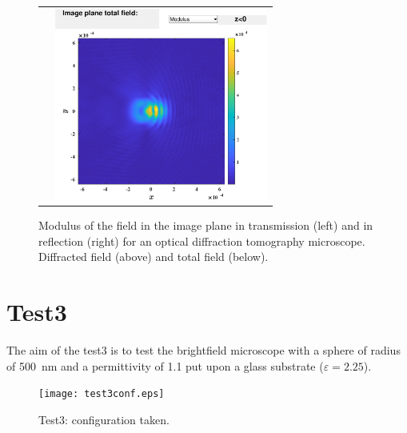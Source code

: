 \begin{figure}[H]
\begin{center}
\begin{tabular}{cc}
&  \includegraphics*[width=7.0cm,draft=false]{test2imageincneg.eps}

\end{tabular}

\end{center}
\caption{Modulus of the field in the image plane in transmission
  (left) and in reflection (right) for an optical diffraction
  tomography microscope. Diffracted field (above) and total field
  (below).}
\end{figure}

\section{Test3}

The aim of the test3 is to test the brightfield microscope with a
sphere of radius of 500~nm and a permittivity of 1.1 put upon a glass
substrate ($\varepsilon=2.25$).

\begin{figure}[H]
\begin{center}
  \texttt{[image: test3conf.eps]}
\end{center}
\caption{Test3: configuration taken.}
\label{test3conf}
\end{figure}

